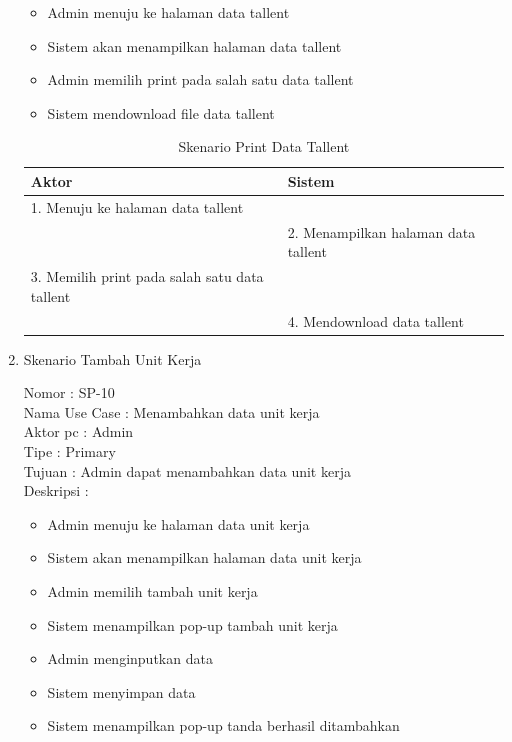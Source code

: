 \begin{enumerate}
\begin{itemize}
	\item Admin menuju ke halaman data tallent
	\item Sistem akan menampilkan halaman data tallent
	\item Admin memilih print pada salah satu data tallent
	\item Sistem mendownload file data tallent
	
\end{itemize}

\begin{table}
	\caption{Skenario Print Data Tallent}
	\centering
	\begin{tabular}{ | p{50mm} | p{70mm} |}
		\hline 
		\textbf{Aktor} & \textbf{Sistem} \\
		\hline
		
		1.	Menuju ke halaman data tallent &  \\
		
		\hline
		
		&  2.	Menampilkan halaman data tallent \\
		
		\hline
		
		3. Memilih print pada salah satu data tallent & \\
		
		\hline
		
		& 4.	Mendownload data tallent \\
		
		\hline
		
	\end{tabular}
\end{table}

\item Skenario Tambah Unit Kerja

Nomor \kern 3.6pc : SP-10 \\
Nama Use Case : Menambahkan data unit kerja \\
Aktor  pc : Admin \\
Tipe \kern 4.6pc : Primary \\
Tujuan \kern 3.6pc : Admin dapat menambahkan data unit kerja \\
Deskripsi \kern 2.5pc : 

\begin{itemize}
	\item Admin menuju ke halaman data unit kerja
	\item Sistem akan menampilkan halaman data unit kerja
	\item Admin memilih tambah unit kerja
	\item Sistem menampilkan pop-up tambah unit kerja
	\item Admin menginputkan data
	\item Sistem menyimpan data
	\item Sistem menampilkan pop-up tanda berhasil ditambahkan
	

\end{itemize}
\end{enumerate}
